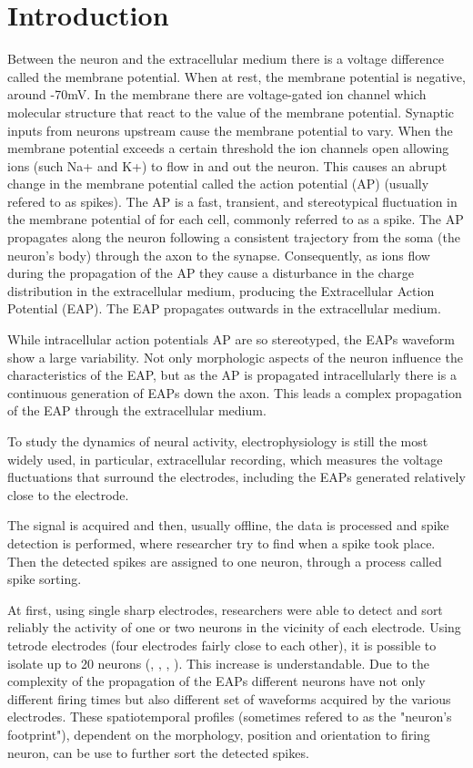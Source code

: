 \section{Introduction}
\label{sec:introduction}

Between the neuron and the extracellular medium there is a voltage difference called the membrane potential. When at rest, the membrane potential is negative, around -70mV.  In the membrane there are voltage-gated ion channel which molecular structure that react to the value of the membrane potential. Synaptic inputs from neurons upstream cause the membrane potential to vary. When the membrane potential exceeds a certain threshold the ion channels open allowing ions (such Na+ and K+) to flow in and out the neuron. This causes an abrupt change in the membrane potential called the action potential (AP) (usually refered to as spikes). The AP is a fast, transient, and stereotypical fluctuation in the membrane potential of for each cell, commonly referred to as a spike. The AP propagates along the neuron following a consistent trajectory from the soma (the neuron's body) through the axon to the synapse. 
Consequently, as ions flow during the propagation of the AP they cause a disturbance in the charge distribution in the extracellular medium, producing the Extracellular Action Potential (EAP). The EAP propagates outwards in the extracellular medium. \cite{kandel}

While intracellular action potentials AP are so stereotyped, the EAPs waveform show a large variability. Not only morphologic aspects of the neuron influence the characteristics of the EAP, but as the AP is propagated intracellularly there is a continuous generation of EAPs down the axon. This leads a complex propagation of the EAP through the extracellular medium. \cite{gold2007biophysics} \cite{pettersen2008amplitude}
 
To study the dynamics of neural activity, electrophysiology is still the most widely used, in particular, extracellular recording, which measures the voltage fluctuations that surround the electrodes, including the EAPs generated relatively close to the electrode.
 
The signal is acquired and then, usually offline, the data is processed and spike detection is performed, where researcher try to find when a spike took place. Then the detected spikes are assigned to one neuron, through a process called spike sorting.

At first, using single sharp electrodes, researchers were able to detect and sort reliably the activity of one or two neurons in the vicinity of each electrode. Using tetrode electrodes (four electrodes fairly close to each other), it is possible to isolate up to 20 neurons (\cite{mcnaughton1983stereotrode}, \cite{gray1995tetrodes}, \cite{wilson1993dynamics}, \cite{recce1989tetrode}). This increase is understandable. Due to the complexity of the propagation of the EAPs different neurons have not only different firing times but also different set of waveforms acquired by the various electrodes. These spatiotemporal profiles (sometimes refered to as the "neuron's footprint"), dependent on the morphology, position and orientation to firing neuron, can be use to further sort the detected spikes.  

